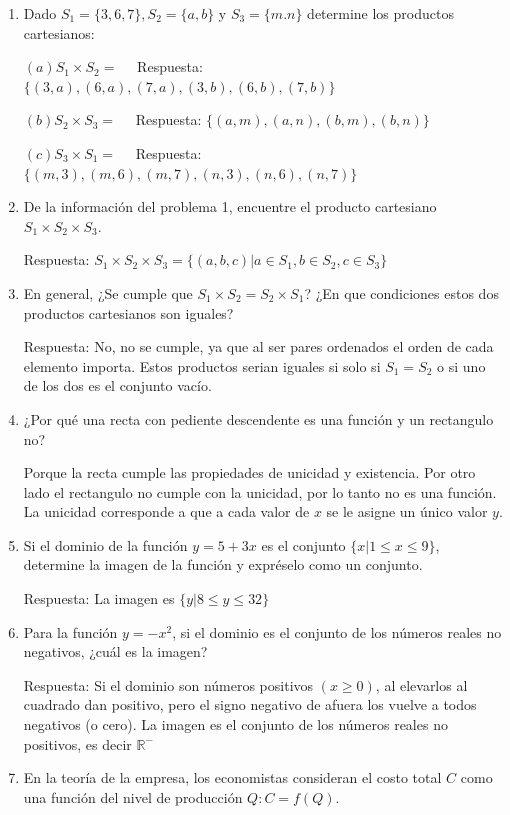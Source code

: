 \begin{ejercicio}
\begin{enumerate}
  \item Dado \(S_1 = \{3,6,7\}, S_2 = \{a,b\}\) y \(S_3 = \{m.n\}\) determine los productos cartesianos: 
  
    \((a) S_1 \times S_2 = \quad\) Respuesta: \(\{(3,a),(6,a),(7,a),(3,b),(6,b),(7,b)\}\)
    
    \((b) S_2 \times S_3 = \quad\) Respuesta: \(\{(a,m),(a,n),(b,m),(b,n)\}\)
    
    \((c) S_3 \times S_1 = \quad\) Respuesta: \(\{(m,3),(m,6),(m,7),(n,3),(n,6),(n,7)\}\)     

  \item De la información del problema 1, encuentre el producto cartesiano \(S_1 \times S_2 \times S_3\).
  
  Respuesta: \(S_1 \times S_2 \times S_3 = \{(a,b,c) | a \in S_1 , b \in S_2 , c \in S_3\}\)
  \item En general, ¿Se cumple que \(S_1 \times S_2 = S_2 \times S_1\)? ¿En que condiciones estos dos productos cartesianos son iguales?
  
  Respuesta: No, no se cumple, ya que al ser pares ordenados el orden de cada elemento importa. Estos productos serian iguales si solo si \(S_1 = S_2\) o si uno de los dos es el conjunto vacío.
  \item ¿Por qué una recta con pediente descendente es una función y un rectangulo no?
  
  Porque la recta cumple las propiedades de unicidad y existencia. Por otro lado el rectangulo no cumple con la unicidad, por lo tanto no es una función. La unicidad corresponde a que a cada valor de \(x\) se le asigne un único valor \(y\).
  \item Si el dominio de la función \(y = 5 + 3x\) es el conjunto \(\{x |1 \leq x \leq 9\}\), determine la imagen de la función y expréselo como un conjunto.

  Respuesta: La imagen es \(\{y |8 \leq y \leq  32\}\)
  \item Para la función \(y = -x^2\), si el dominio es el conjunto de los números reales no negativos, ¿cuál es la imagen?
  
  Respuesta: Si el dominio son números positivos \((x≥0)\), al elevarlos al cuadrado dan positivo, pero el signo negativo de afuera los vuelve a todos negativos (o cero). La imagen es el conjunto de los números reales no positivos, es decir \(\mathbb{R}^-\) 
  \item En la teoría de la empresa, los economistas consideran el costo total \(C\) como una función del nivel de producción \(Q: C=f(Q)\).


\end{enumerate}
\end{ejercicio}
